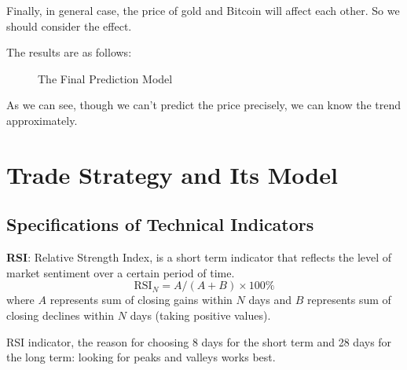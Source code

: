 \documentclass[12pt]{article}
\begin{document}
    Finally, in general case, the price of gold and Bitcoin will affect each other.
    So we should consider the effect.

    The results are as follows:
    \begin{figure}[H]
        \centering
        \caption{The Final Prediction Model}
        \label{fig:3rd model}
    \end{figure}

    As we can see, though we can't predict the price precisely, we can know the trend approximately.
    

    \section{Trade Strategy and Its Model}
    \subsection{Specifications of Technical Indicators}
    
    \noindent\textbf{RSI}: Relative Strength Index, is a short term indicator that reflects the level of market sentiment over a certain period of time.
    \[\text{RSI}_N=A/(A+B)\times 100\%\]
    where $A$ represents sum of closing gains within $N$ days and $B$ represents sum of closing declines within $N$ days (taking positive values).
    
    RSI indicator, the reason for choosing 8 days for the short term and 28 days for the long term: looking for peaks and valleys works best.
    
\end{document}
